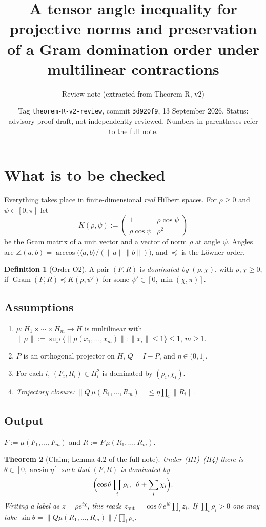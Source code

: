 \documentclass[11pt]{amsart}
\title[A tensor angle inequality and Gram domination]{A tensor angle inequality for projective norms and preservation of a Gram domination order under multilinear contractions}
\author{Review note (extracted from Theorem R, v2)}
\date{Tag \texttt{theorem-R-v2-review}, commit \texttt{3d920f9}, 13 September 2026. Status: advisory proof draft, not independently reviewed. Numbers in parentheses refer to the full note.}
\newtheorem{theorem}{Theorem}
\theoremstyle{definition}
\newtheorem{definition}[theorem]{Definition}
\newcommand{\Gram}{\operatorname{Gram}}
\newcommand{\norm}[1]{\lVert #1\rVert}
\newcommand{\ip}[2]{\langle #1,#2\rangle}
\begin{document}
\maketitle

\section{What is to be checked}

Everything takes place in finite-dimensional \emph{real} Hilbert spaces. For
$\rho\ge0$ and $\psi\in[0,\pi]$ let
\[
K(\rho,\psi):=\begin{pmatrix}1&\rho\cos\psi\\ \rho\cos\psi&\rho^2\end{pmatrix}
\]
be the Gram matrix of a unit vector and a vector of norm $\rho$ at angle $\psi$.
Angles are $\angle(a,b)=\arccos\bigl(\ip ab/(\norm a\norm b)\bigr)$, and $\preceq$ is
the Löwner order.

\begin{definition}[Order O2]
A pair $(F,R)$ is \emph{dominated by} $(\rho,\chi)$, with $\rho,\chi\ge0$, if
$\Gram(F,R)\preceq K(\rho,\psi')$ for some $\psi'\in[0,\min(\chi,\pi)]$.
\end{definition}

\subsection*{Assumptions}
\begin{enumerate}[label=\textup{(H\arabic*)}]
\item $\mu:H_1\times\cdots\times H_m\to H$ is multilinear with
  $\norm\mu:=\sup\{\norm{\mu(x_1,\dots,x_m)}:\norm{x_i}\le1\}\le1$, $m\ge1$.
\item $P$ is an orthogonal projector on $H$, $Q=I-P$, and $\eta\in(0,1]$.
\item For each $i$, $(F_i,R_i)\in H_i^2$ is dominated by $(\rho_i,\chi_i)$.
\item \emph{Trajectory closure:} $\norm{Q\,\mu(R_1,\dots,R_m)}\le\eta\prod_i\norm{R_i}$.
\end{enumerate}

\subsection*{Output}
$F:=\mu(F_1,\dots,F_m)$ and $R:=P\,\mu(R_1,\dots,R_m)$.

\begin{theorem}[Claim; Lemma 4.2 of the full note]\label{thm:claim}
Under \textup{(H1)--(H4)} there is $\theta\in[0,\arcsin\eta]$ such that $(F,R)$ is
dominated by
\[
\Bigl(\cos\theta\prod_i\rho_i,\;\;\theta+\sum_i\chi_i\Bigr).
\]
Writing a label as $z=\rho e^{i\chi}$, this reads
$z_{\mathrm{out}}=\cos\theta\,e^{i\theta}\prod_iz_i$. If $\prod_i\rho_i>0$ one may take
$\sin\theta=\norm{Q\mu(R_1,\dots,R_m)}/\prod_i\rho_i$.
\end{theorem}
\end{document}
